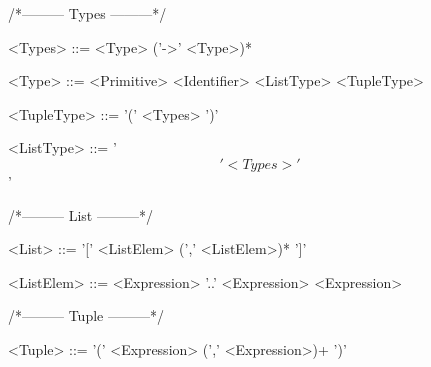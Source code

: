 /*--------- Types ---------*/
\begin{grammar}
<Types> ::= <Type> ('->' <Type>)*

<Type> ::= <Primitive>
 \alt <Identifier>
 \alt <ListType>
 \alt <TupleType>

<TupleType> ::= '(' <Types> ')'

<ListType> ::= '\[' <Types> '\]'
\end{grammar}
/*--------- List ---------*/
\begin{grammar}
<List> ::= '[' <ListElem> (',' <ListElem>)* ']'

<ListElem> ::= <Expression> '..' <Expression>
 \alt <Expression>
\end{grammar}
/*--------- Tuple ---------*/
\begin{grammar}
<Tuple> ::= '(' <Expression> (',' <Expression>)+ ')'
\end{grammar}